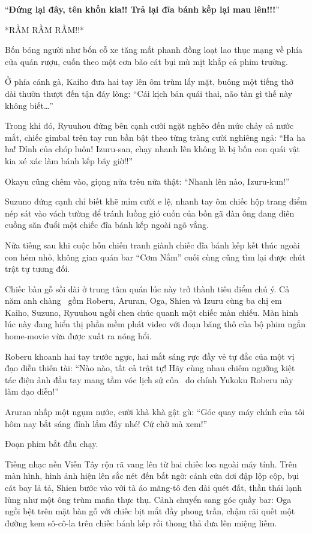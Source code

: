 \documentclass[../main.tex]{subfiles}
\begin{document}
``\textbf{Đứng lại đây, tên khốn kia!! Trả lại đĩa bánh kếp lại mau lên!!!}''


*RẦM RẦM RẦM!!*

Bốn bóng người như bốn cỗ xe tăng mất phanh đồng loạt lao thục mạng về phía cửa quán rượu, cuốn theo một cơn bão cát bụi mù mịt khắp cả phim trường.

Ở phía cánh gà, Kaiho đưa hai tay lên ôm trùm lấy mặt, buông một tiếng thở dài thườn thượt đến tận đáy lòng: ``Cái kịch bản quái thai, não tàn gì thế này không biết\dots''

Trong khi đó, Ryuuhou đứng bên cạnh cười ngặt nghẽo đến mức chảy cả nước mắt, chiếc gimbal trên tay run bần bật theo từng tràng cười nghiêng ngả: ``Ha ha ha! Đỉnh của chóp luôn! Izuru-san, chạy nhanh lên không là bị bốn con quái vật kia xé xác làm bánh kếp bây giờ!!''

Okayu cũng chêm vào, giọng nửa trêu nửa thật: ``Nhanh lên nào, Izuru-kun!''

Suzuno đứng cạnh chỉ biết khẽ mỉm cười e lệ, nhanh tay ôm chiếc hộp trang điểm nép sát vào vách tường để tránh luồng gió cuốn của bốn gã đàn ông đang điên cuồng săn đuổi một chiếc đĩa bánh kếp ngoài ngõ vắng.

\omk

Nửa tiếng sau khi cuộc hỗn chiến tranh giành chiếc đĩa bánh kếp kết thúc ngoài con hẻm nhỏ, không gian quán bar ``Cơm Nắm'' cuối cùng cũng tìm lại được chút trật tự tương đối.

Chiếc bàn gỗ sồi dài ở trung tâm quán lúc này trở thành tiêu điểm chú ý. Cả năm anh chàng \hls\ gồm Roberu, Aruran, Oga, Shien và Izuru cùng ba chị em Kaiho, Suzuno, Ryuuhou ngồi chen chúc quanh một chiếc màn chiếu. Màn hình lúc này đang hiển thị phần mềm phát video với đoạn băng thô của bộ phim ngắn home-movie vừa được xuất ra nóng hổi.

Roberu khoanh hai tay trước ngực, hai mắt sáng rực đầy vẻ tự đắc của một vị đạo diễn thiên tài: ``Nào nào, tất cả trật tự! Hãy cùng nhau chiêm ngưỡng kiệt tác điện ảnh đầu tay mang tầm vóc lịch sử của \hls\ do chính Yukoku Roberu này làm đạo diễn!''

Aruran nhấp một ngụm nước, cười khà khà gật gù: ``Góc quay máy chính của tôi hôm nay bắt sáng đỉnh lắm đấy nhé! Cứ chờ mà xem!''

Đoạn phim bắt đầu chạy.

Tiếng nhạc nền Viễn Tây rộn rã vang lên từ hai chiếc loa ngoài máy tính. Trên màn hình, hình ảnh hiện lên sắc nét đến bất ngờ: cánh cửa dơi đập lộp cộp, bụi cát bay lả tả, Shien bước vào với tà áo măng-tô đen dài quét đất, thần thái lạnh lùng như một ông trùm mafia thực thụ. Cảnh chuyển sang góc quầy bar: Oga ngồi bệt trên mặt bàn gỗ với chiếc bịt mắt đầy phong trần, chậm rãi quết một đường kem sô-cô-la trên chiếc bánh kếp rồi thong thả đưa lên miệng liếm.
\end{document}
